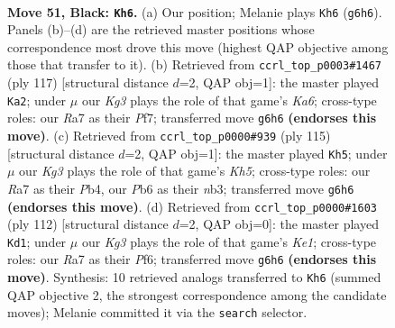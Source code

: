 \documentclass[11pt]{article}
\begin{document}
\clearpage

\begin{figure}[p]\centering
\begin{subfigure}{0.46\textwidth}\centering
\resizebox{\linewidth}{!}{%
\newchessgame
\chessboard[
  setfen={8/r7/1p4k1/8/7K/8/8/8 b - - 1 51},
  showmover=false,
  pgfstyle=straightmove, color=movearrow, markmove={g6-h6}
]}
\caption{}
\end{subfigure}\hfill
\begin{subfigure}{0.46\textwidth}\centering
\resizebox{\linewidth}{!}{%
\newchessgame
\chessboard[
  setfen={8/5p2/8/8/8/k7/2K5/8 b - - 3 59},
  showmover=false,
  pgfstyle=straightmove, color=movearrow, markmove={a3-a2}
]}
\caption{}
\end{subfigure}
\\[4pt]
\begin{subfigure}{0.46\textwidth}\centering
\resizebox{\linewidth}{!}{%
\newchessgame
\chessboard[
  setfen={8/8/8/5K2/1p5k/1N6/8/8 b - - 1 58},
  showmover=false,
  pgfstyle=straightmove, color=movearrow, markmove={h4-h5}
]}
\caption{}
\end{subfigure}\hfill
\begin{subfigure}{0.46\textwidth}\centering
\resizebox{\linewidth}{!}{%
\newchessgame
\chessboard[
  setfen={8/8/3k1P2/8/8/8/8/4K3 w - - 3 57},
  showmover=false,
  pgfstyle=straightmove, color=movearrow, markmove={e1-d1}
]}
\caption{}
\end{subfigure}
\caption{\textbf{Move 51, Black: \texttt{Kh6}.} (a) Our position; Melanie plays \texttt{Kh6} (\texttt{g6h6}). Panels (b)--(d) are the retrieved master positions whose correspondence most drove this move (highest QAP objective among those that transfer to it). (b) Retrieved from \texttt{ccrl\_top\_p0003\#1467} (ply 117) [structural distance $d$=2, QAP obj=1]: the master played \texttt{Ka2}; under $\mu$ our \emph{Kg3} plays the role of that game's \emph{Ka6}; cross-type roles: our \emph{R}a7 as their \emph{P}f7; transferred move \texttt{g6h6} \textbf{(endorses this move)}. (c) Retrieved from \texttt{ccrl\_top\_p0000\#939} (ply 115) [structural distance $d$=2, QAP obj=1]: the master played \texttt{Kh5}; under $\mu$ our \emph{Kg3} plays the role of that game's \emph{Kh5}; cross-type roles: our \emph{R}a7 as their \emph{P}b4, our \emph{P}b6 as their \emph{n}b3; transferred move \texttt{g6h6} \textbf{(endorses this move)}. (d) Retrieved from \texttt{ccrl\_top\_p0000\#1603} (ply 112) [structural distance $d$=2, QAP obj=0]: the master played \texttt{Kd1}; under $\mu$ our \emph{Kg3} plays the role of that game's \emph{Ke1}; cross-type roles: our \emph{R}a7 as their \emph{P}f6; transferred move \texttt{g6h6} \textbf{(endorses this move)}. Synthesis: 10 retrieved analogs transferred to \texttt{Kh6} (summed QAP objective 2, the strongest correspondence among the candidate moves); Melanie committed it via the \texttt{search} selector.}
\label{fig:thought-m101}
\end{figure}
\end{document}

